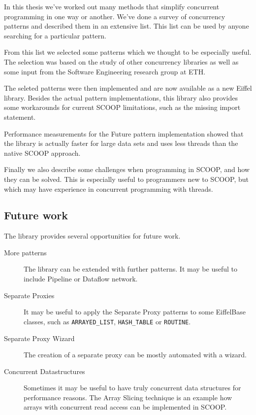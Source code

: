 \documentclass[a4paper,10pt]{article}
\begin{document}
In this thesis we've worked out many methods that simplify concurrent programming in one way or another.
We've done a survey of concurrency patterns and described them in an extensive list.
This list can be used by anyone searching for a particular pattern.

From this list we selected some patterns which we thought to be especially useful.
The selection was based on the study of other concurrency libraries as well as some input from the Software Engineering research group at ETH.

The seleted patterns were then implemented and are now available as a new Eiffel library.
Besides the actual pattern implementations, this library also provides some workarounds for current SCOOP limitations, such as the missing import statement.

Performance measurements for the Future pattern implementation showed that the library is actually faster for large data sets and uses less threads than the native SCOOP approach.

Finally we also describe some challenges when programming in SCOOP, and how they can be solved.
This is especially useful to programmers new to SCOOP, but which may have experience in concurrent programming with threads.

\subsection{Future work}

The library provides several opportunities for future work.

\begin{description}
 \item [More patterns] The library can be extended with further patterns.
 It may be useful to include Pipeline or Dataflow network.
 \item [Separate Proxies] It may be useful to apply the Separate Proxy patterns to some EiffelBase classes, such as \lstinline!ARRAYED_LIST!, \lstinline!HASH_TABLE! or \lstinline!ROUTINE!.
 \item [Separate Proxy Wizard] The creation of a separate proxy can be mostly automated with a wizard.
 \item [Concurrent Datastructures] Sometimes it may be useful to have truly concurrent data structures for performance reasons.
The Array Slicing technique \cite{paper:array-slicing} is an example how arrays with concurrent read access can be implemented in SCOOP.
\end{description}
\end{document}
